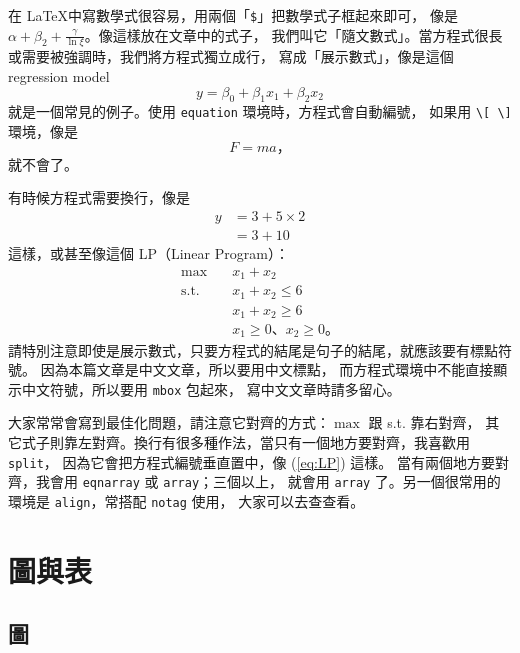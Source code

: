 \documentclass[12pt, a4paper]{article}
\begin{document}
在 \LaTeX 中寫數學式很容易，用兩個「\verb|$|」把數學式子框起來即可，
像是 $\alpha + \beta_2 + \frac{\gamma}{\ln \xi}$。像這樣放在文章中的式子，
我們叫它「隨文數式」。當方程式很長或需要被強調時，我們將方程式獨立成行，
寫成「展示數式」，像是這個 regression model
\begin{equation}\label{eq:reg}
	y = \beta_0 + \beta_1 x_1 + \beta_2 x_2
\end{equation}
就是一個常見的例子。使用 \verb|equation| 環境時，方程式會自動編號，
如果用 \verb|\[ \]| 環境，像是
\[
	F = ma\mbox{，} 
\]
就不會了。

有時候方程式需要換行，像是
\[\begin{split}
	y &= 3 + 5 \times 2 \\
		&= 3 + 10
\end{split}\]
這樣，或甚至像這個 LP（Linear Program）：
\begin{equation}\label{eq:LP}\begin{split}
	\max \quad & x_1 + x_2 \\
	\mbox{s.t.} \quad 
	& x_1 + x_2 \leq 6 \\
	& x_1 + x_2 \geq 6 \\
	& x_1 \geq 0 \mbox{、} x_2 \geq 0\mbox{。} 
\end{split}\end{equation}
請特別注意即使是展示數式，只要方程式的結尾是句子的結尾，就應該要有標點符號。
因為本篇文章是中文文章，所以要用中文標點，
而方程式環境中不能直接顯示中文符號，所以要用 \verb|mbox| 包起來，
寫中文文章時請多留心。

大家常常會寫到最佳化問題，請注意它對齊的方式：$\max$ 跟 s.t. 靠右對齊，
其它式子則靠左對齊。換行有很多種作法，當只有一個地方要對齊，我喜歡用 \verb|split|，
因為它會把方程式編號垂直置中，像 (\ref{eq:LP}) 這樣。
當有兩個地方要對齊，我會用 \verb|eqnarray| 或 \verb|array|；三個以上，
就會用 \verb|array| 了。另一個很常用的環境是 \verb|align|，常搭配 \verb|notag| 使用，
大家可以去查查看。













\section{圖與表}

\subsection{圖}
\end{document}
